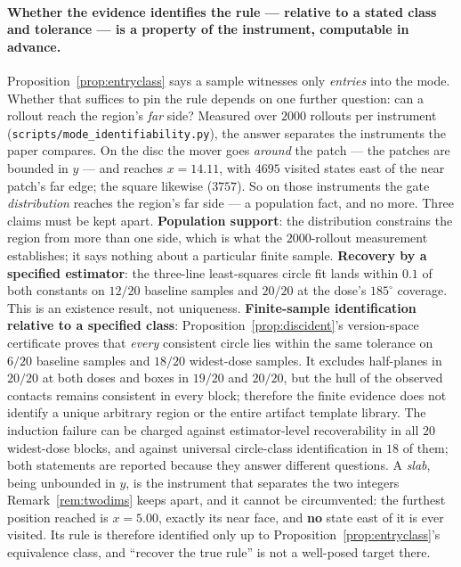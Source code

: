 \documentclass[11pt]{article}
\theoremstyle{definition}
\theoremstyle{remark}
\begin{document}
\paragraph{Whether the evidence identifies the rule --- relative to a stated class and tolerance --- is a property of the instrument, computable in advance.} Proposition~\ref{prop:entryclass} says a sample witnesses only \emph{entries} into the mode. Whether that suffices to pin the rule depends on one further question: can a rollout reach the region's \emph{far} side? Measured over $2000$ rollouts per instrument (\texttt{scripts/\allowbreak mode\_\allowbreak identifiability.py}), the answer separates the instruments the paper compares. On the disc the mover goes \emph{around} the patch --- the patches are bounded in $y$ --- and reaches $x = 14.11$, with $4695$ visited states east of the near patch's far edge; the square likewise ($3757$). So on those instruments the gate \emph{distribution} reaches the region's far side --- a population fact, and no more. Three claims must be kept apart. \textbf{Population support}: the distribution constrains the region from more than one side, which is what the $2000$-rollout measurement establishes; it says nothing about a particular finite sample. \textbf{Recovery by a specified estimator}: the three-line least-squares circle fit lands within $0.1$ of both constants on $12/20$ baseline samples and $20/20$ at the dose's $185^\circ$ coverage. This is an existence result, not uniqueness. \textbf{Finite-sample identification relative to a specified class}: Proposition~\ref{prop:discident}'s version-space certificate proves that \emph{every} consistent circle lies within the same tolerance on $6/20$ baseline samples and $18/20$ widest-dose samples. It excludes half-planes in $20/20$ at both doses and boxes in $19/20$ and $20/20$, but the hull of the observed contacts remains consistent in every block; therefore the finite evidence does not identify a unique arbitrary region or the entire artifact template library. The induction failure can be charged against estimator-level recoverability in all $20$ widest-dose blocks, and against universal circle-class identification in $18$ of them; both statements are reported because they answer different questions. A \emph{slab}, being unbounded in $y$, is the instrument that separates the two integers Remark~\ref{rem:twodims} keeps apart, and it cannot be circumvented: the furthest position reached is $x = 5.00$, exactly its near face, and \textbf{no} state east of it is ever visited. Its rule is therefore identified only up to Proposition~\ref{prop:entryclass}'s equivalence class, and ``recover the true rule'' is not a well-posed target there.
\end{document}
